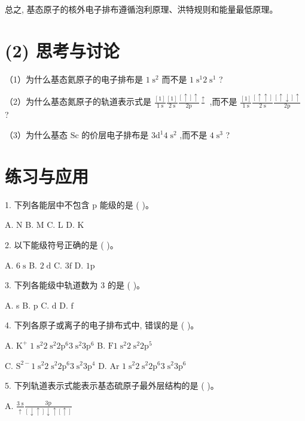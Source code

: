 \documentclass[10pt]{article}
\begin{document}
总之, 基态原子的核外电子排布遵循泡利原理、洪特规则和能量最低原理。

\section*{(2) 思考与讨论}

（1）为什么基态氦原子的电子排布是 \(1{\mathrm{\;s}}^{2}\) 而不是 \(1{\mathrm{\;s}}^{1}2{\mathrm{\;s}}^{1}\) ?

（2）为什么基态氮原子的轨道表示式是 \(\frac{\left\lbrack 1\right\rbrack }{1\mathrm{\;s}}\frac{\left\lbrack 1\right\rbrack }{2\mathrm{\;s}}\frac{\left\lbrack \uparrow \right\rbrack \uparrow }{2\mathrm{p}}\frac{ \uparrow }{}\) ,而不是 \(\frac{\left\lbrack 1\right\rbrack }{1\mathrm{\;s}}\frac{\left\lbrack \uparrow \uparrow \right\rbrack }{2\mathrm{\;s}}\frac{\left\lbrack { \uparrow \downarrow }\right\rbrack \uparrow }{2\mathrm{p}}\) ?

（3）为什么基态 \(\mathrm{{Sc}}\) 的价层电子排布是 \(3{\mathrm{d}}^{1}4{\mathrm{\;s}}^{2}\) ,而不是 \(4{\mathrm{\;s}}^{3}\) ?

\section*{练习与应用}

1. 下列各能层中不包含 \(\mathrm{p}\) 能级的是 ( )。

A. \(\mathrm{N}\) B. \(\mathrm{M}\) C. L D. \(\mathrm{K}\)

2. 以下能级符号正确的是 ( )。

A. \(6\mathrm{\;s}\) B. \(2\mathrm{\;d}\) C. \(3\mathrm{f}\) D. \(1\mathrm{p}\)

3. 下列各能级中轨道数为 3 的是 ( )。

A. s B. \(\mathrm{p}\) C. \(\mathrm{d}\) D. \(\mathrm{f}\)

4. 下列各原子或离子的电子排布式中, 错误的是 ( )。

A. \({\mathrm{K}}^{ + }\;1{\mathrm{\;s}}^{2}2{\mathrm{\;s}}^{2}2{\mathrm{p}}^{6}3{\mathrm{\;s}}^{2}3{\mathrm{p}}^{6}\) B. \(\mathrm{F}1{\mathrm{\;s}}^{2}2{\mathrm{\;s}}^{2}2{\mathrm{p}}^{5}\)

C. \({\mathrm{S}}^{2 - }1{\mathrm{\;s}}^{2}2{\mathrm{\;s}}^{2}2{\mathrm{p}}^{6}3{\mathrm{\;s}}^{2}3{\mathrm{p}}^{4}\) D. Ar \(1{\mathrm{\;s}}^{2}2{\mathrm{\;s}}^{2}2{\mathrm{p}}^{6}3{\mathrm{\;s}}^{2}3{\mathrm{p}}^{6}\)

5. 下列轨道表示式能表示基态硫原子最外层结构的是 ( )。

A. \(\frac{3\mathrm{\;s}}{ \uparrow }\frac{3\mathrm{p}}{\left\lbrack { \downarrow \uparrow }\right\rbrack \downarrow \uparrow \left\lbrack \uparrow \right\rbrack }\)
\end{document}
